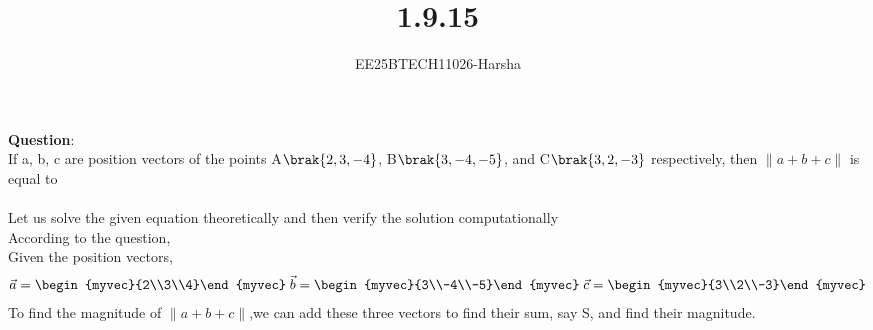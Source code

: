 \documentclass[journal]{IEEEtran}
\begin{document}

\vspace{3cm}

\title{1.9.15}
\author{EE25BTECH11026-Harsha}
 \maketitle
{\let\newpage\relax\maketitle}

\renewcommand{\thefigure}{\theenumi}
\renewcommand{\thetable}{\theenumi}
\setlength{\intextsep}{10pt} %


\renewcommand{\thetable}{\theenumi}

\textbf{Question}:\\
If a, b, c are position vectors of the points A$\brak{2, 3, -4}$, B$\brak{3, -4, -5}$, and C$\brak{3, 2, -3}$ respectively, then $\|a + b + c\|$ is equal to\\ 
\solution \\
Let us solve the given equation theoretically and then verify the solution computationally \\
According to the question, \\
Given the position vectors,
\begin{align}
    \vec{a}=\begin{myvec}{2\\3\\4}\end{myvec}\;
    \vec{b}=\begin{myvec}{3\\-4\\-5}\end{myvec}\;
    \vec{c}=\begin{myvec}{3\\2\\-3}\end{myvec}
\end{align}
To find the magnitude of $\|a+b+c\|$,we can add these three vectors to find their sum, say S, and find their magnitude.\\
\end{document}
